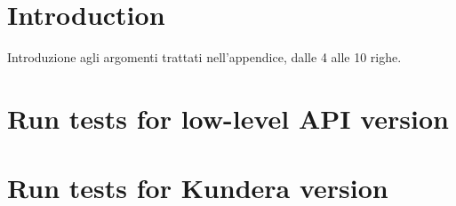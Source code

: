 \section{Introduction}
Introduzione agli argomenti trattati nell'appendice, dalle 4 alle 10 righe.

\section{Run tests for low-level API version}
\label{appendix:ycsb-low-level}

\section{Run tests for Kundera version}
\label{appendix:ycsb-kunders}
